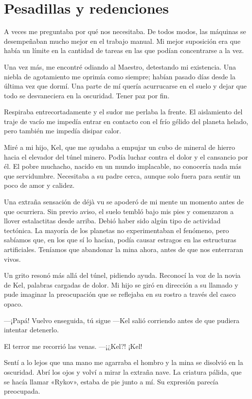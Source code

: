 \chapter{Pesadillas y redenciones}\label{sec:pesadillas-y-redenciones}

A veces me preguntaba por qué nos necesitaba. De todos modos, las máquinas se desempeñaban mucho mejor en el trabajo manual. Mi mejor suposición era que había un límite en la cantidad de tareas en las que podían concentrarse a la vez.

Una vez más, me encontré odiando al Maestro, detestando mi existencia. Una niebla de agotamiento me oprimía como siempre; habían pasado días desde la última vez que dormí. Una parte de mí quería acurrucarse en el suelo y dejar que todo se desvaneciera en la oscuridad. Tener paz por fin.

Respiraba entrecortadamente y el sudor me perlaba la frente. El aislamiento del traje de vacío me impedía entrar en contacto con el frío gélido del planeta helado, pero también me impedía disipar calor.

Miré a mi hijo, Kel, que me ayudaba a empujar un cubo de mineral de hierro hacia el elevador del túnel minero. Podía luchar contra el dolor y el cansancio por él. El pobre muchacho, nacido en un mundo implacable, no conocería nada más que servidumbre. Necesitaba a su padre cerca, aunque solo fuera para sentir un poco de amor y calidez.

Una extraña sensación de déjà vu se apoderó de mi mente un momento antes de que ocurriera. Sin previo aviso, el suelo tembló bajo mis pies y comenzaron a llover estalactitas desde arriba. Debió haber sido algún tipo de actividad tectónica. La mayoría de los planetas no experimentaban el fenómeno, pero sabíamos que, en los que sí lo hacían, podía causar estragos en las estructuras artificiales. Teníamos que abandonar la mina ahora, antes de que nos enterraran vivos.

Un grito resonó más allá del túnel, pidiendo ayuda. Reconocí la voz de la novia de Kel, palabras cargadas de dolor. Mi hijo se giró en dirección a su llamado y pude imaginar la preocupación que se reflejaba en su rostro a través del casco opaco.

—¡Papá! Vuelvo enseguida, tú sigue —Kel salió corriendo antes de que pudiera intentar detenerlo.

El terror me recorrió las venas. —¡¿Kel?! ¡Kel!

Sentí a lo lejos que una mano me agarraba el hombro y la mina se disolvió en la oscuridad. Abrí los ojos y volví a mirar la extraña nave. La criatura pálida, que se hacía llamar «Rykov», estaba de pie junto a mí. Su expresión parecía preocupada.

